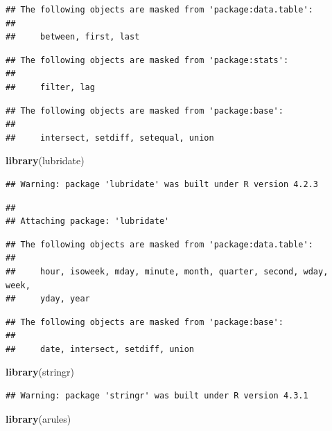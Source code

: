 \documentclass[
]{article}
\newenvironment{Shaded}{\begin{snugshade}}{\end{snugshade}}
\newcommand{\FunctionTok}[1]{\textcolor[rgb]{0.13,0.29,0.53}{\textbf{#1}}}
\newcommand{\NormalTok}[1]{#1}
\begin{document}
\begin{verbatim}
## The following objects are masked from 'package:data.table':
## 
##     between, first, last
\end{verbatim}

\begin{verbatim}
## The following objects are masked from 'package:stats':
## 
##     filter, lag
\end{verbatim}

\begin{verbatim}
## The following objects are masked from 'package:base':
## 
##     intersect, setdiff, setequal, union
\end{verbatim}

\begin{Shaded}
\begin{Highlighting}[]
\FunctionTok{library}\NormalTok{(lubridate)}
\end{Highlighting}
\end{Shaded}

\begin{verbatim}
## Warning: package 'lubridate' was built under R version 4.2.3
\end{verbatim}

\begin{verbatim}
## 
## Attaching package: 'lubridate'
\end{verbatim}

\begin{verbatim}
## The following objects are masked from 'package:data.table':
## 
##     hour, isoweek, mday, minute, month, quarter, second, wday, week,
##     yday, year
\end{verbatim}

\begin{verbatim}
## The following objects are masked from 'package:base':
## 
##     date, intersect, setdiff, union
\end{verbatim}

\begin{Shaded}
\begin{Highlighting}[]
\FunctionTok{library}\NormalTok{(stringr)}
\end{Highlighting}
\end{Shaded}

\begin{verbatim}
## Warning: package 'stringr' was built under R version 4.3.1
\end{verbatim}

\begin{Shaded}
\begin{Highlighting}[]
\FunctionTok{library}\NormalTok{(arules)}
\end{Highlighting}
\end{Shaded}
\end{document}
